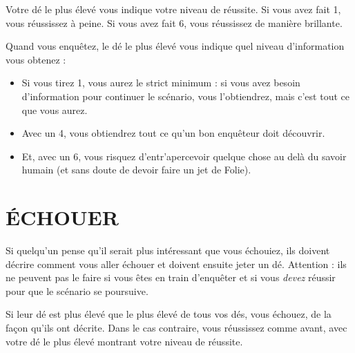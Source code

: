 Votre dé le plus élevé vous indique votre niveau de réussite. Si vous avez fait 1, vous réussissez à peine. Si vous avez fait 6, vous réussissez de manière brillante.


Quand vous enquêtez, le dé le plus élevé vous indique quel niveau d'information vous obtenez :
\begin{itemize}
\item Si vous tirez 1, vous aurez le strict minimum : si vous avez besoin d'information pour continuer le scénario, vous l'obtiendrez, mais c'est tout ce que vous aurez.
\item Avec un 4, vous obtiendrez tout ce qu'un bon enquêteur doit découvrir.
\item Et, avec un 6, vous risquez d'entr'apercevoir quelque chose au delà du savoir humain (et sans doute de devoir faire un jet de Folie).
\end{itemize}


\section{ÉCHOUER}

Si quelqu'un pense qu'il serait plus intéressant que vous échouiez, ils doivent décrire comment vous aller échouer et doivent ensuite jeter un dé. Attention : ils ne peuvent pas le faire si vous êtes en train d'enquêter et si vous \textit{devez} réussir pour que le scénario se poursuive.

Si leur dé est plus élevé que le plus élevé de tous vos dés, vous échouez, de la façon qu'ils ont décrite. Dans le cas contraire, vous réussissez comme avant, avec votre dé le plus élevé montrant votre niveau de réussite.

